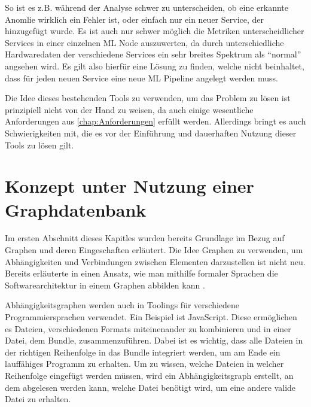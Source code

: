 \documentclass[
	12pt,
	BCOR=5mm,
	DIV=12,
	headinclude=on,
	footinclude=off,
	parskip=half,
	bibliography=totoc,
	listof=entryprefix,
	toc=listof,
	numbers=noenddot,
	plainfootsepline
]{scrreprt}
\begin{document}
So ist es z.B. während der Analyse schwer zu unterscheiden, ob eine erkannte Anomlie wirklich ein Fehler ist, oder einfach nur ein neuer Service, der hinzugefügt wurde. Es ist auch nur schwer möglich die Metriken unterscheidlicher Services in einer einzelnen \ac{ML} Node auszuwerten, da durch unterschiedliche Hardwaredaten der verschiedene Services ein sehr breites Spektrum als \enquote{normal} angsehen wird. Es gilt also hierfür eine Lösung zu finden, welche nicht beinhaltet, dass für jeden neuen Service eine neue \ac{ML} Pipeline angelegt werden muss.

Die Idee dieses bestehenden Tools zu verwenden, um das Problem zu lösen ist prinzipiell nicht von der Hand zu weisen, da auch einige wesentliche Anforderungen aus \vref{chap:Anforderungen} erfüllt werden. Allerdings bringt es auch Schwierigkeiten mit, die es vor der Einführung und dauerhaften Nutzung dieser Tools zu lösen gilt.

\section{Konzept unter Nutzung einer Graphdatenbank}

Im ersten Abschnitt dieses Kapitles wurden bereits Grundlage im Bezug auf Graphen und deren Eingeschaften erläutert. Die Idee Graphen zu verwenden, um Abhängigkeiten und Verbindungen zwischen Elementen darzustellen ist nicht neu. Bereits \citeyear{Metayer1998} erläuterte \citeauthor{Metayer1998} in  einen Ansatz, wie man mithilfe formaler Sprachen die Softwarearchitektur in einem Graphen abbilden kann \autocite{Metayer1998}.

\begin{example}[Abhängigkeitsgraphen]
	Abhängigkeitsgraphen werden auch in Toolings für verschiedene Programmiersprachen verwendet. Ein Beispiel ist JavaScript. Diese ermöglichen es Dateien, verschiedenen Formats miteinenander zu kombinieren und in einer Datei, dem Bundle, zusammenzuführen. Dabei ist es wichtig, dass alle Dateien in der richtigen Reihenfolge in das Bundle integriert werden, um am Ende ein lauffähiges Programm zu erhalten. Um zu wissen, welche Dateien in welcher Reihenfolge eingefügt werden müssen, wird ein Abhängigkeitsgraph erstellt, an dem abgelesen werden kann, welche Datei benötigt wird, um eine andere valide Datei zu erhalten.
\end{example}
\end{document}
